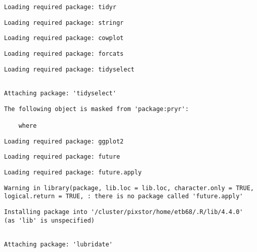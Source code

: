 \documentclass[
  letterpaper,
  DIV=11,
  numbers=noendperiod]{scrartcl}
\begin{document}
\begin{verbatim}
Loading required package: tidyr
\end{verbatim}

\begin{verbatim}
Loading required package: stringr
\end{verbatim}

\begin{verbatim}
Loading required package: cowplot
\end{verbatim}

\begin{verbatim}
Loading required package: forcats
\end{verbatim}

\begin{verbatim}
Loading required package: tidyselect
\end{verbatim}

\begin{verbatim}

Attaching package: 'tidyselect'
\end{verbatim}

\begin{verbatim}
The following object is masked from 'package:pryr':

    where
\end{verbatim}

\begin{verbatim}
Loading required package: ggplot2
\end{verbatim}

\begin{verbatim}
Loading required package: future
\end{verbatim}

\begin{verbatim}
Loading required package: future.apply
\end{verbatim}

\begin{verbatim}
Warning in library(package, lib.loc = lib.loc, character.only = TRUE,
logical.return = TRUE, : there is no package called 'future.apply'
\end{verbatim}

\begin{verbatim}
Installing package into '/cluster/pixstor/home/etb68/.R/lib/4.4.0'
(as 'lib' is unspecified)
\end{verbatim}

\begin{verbatim}

Attaching package: 'lubridate'
\end{verbatim}
\end{document}
